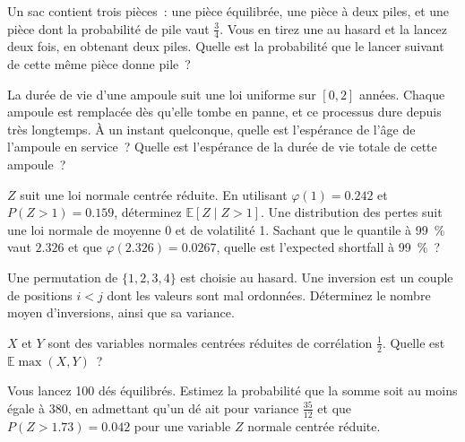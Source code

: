 
\begin{question}\label{iq:iv1:timed-test-7:7}
Un sac contient trois pièces~: une pièce équilibrée, une pièce à deux piles, et une pièce dont la probabilité de pile vaut $\frac34$. Vous en tirez une au hasard et la lancez deux fois, en obtenant deux piles. Quelle est la probabilité que le lancer suivant de cette même pièce donne pile~?
\end{question}

\begin{question}\label{iq:iv1:timed-test-7:8}
La durée de vie d'une ampoule suit une loi uniforme sur $[0, 2]$ années. Chaque ampoule est remplacée dès qu'elle tombe en panne, et ce processus dure depuis très longtemps. À un instant quelconque, quelle est l'espérance de l'âge de l'ampoule en service~? Quelle est l'espérance de la durée de vie totale de cette ampoule~?
\end{question}

\begin{question}\label{iq:iv1:timed-test-7:9}
$Z$ suit une loi normale centrée réduite. En utilisant $\varphi(1) = 0.242$ et $P(Z > 1) = 0.159$, déterminez $\mathbb{E}[Z \mid Z > 1]$. Une distribution des pertes suit une loi normale de moyenne 0 et de volatilité 1. Sachant que le quantile à 99~\% vaut $2.326$ et que $\varphi(2.326) = 0.0267$, quelle est l'expected shortfall à 99~\%~?
\end{question}

\begin{question}\label{iq:iv1:timed-test-7:10}
Une permutation de $\{1, 2, 3, 4\}$ est choisie au hasard. Une inversion est un couple de positions $i < j$ dont les valeurs sont mal ordonnées. Déterminez le nombre moyen d'inversions, ainsi que sa variance.
\end{question}

\begin{question}\label{iq:iv1:timed-test-7:11}
$X$ et $Y$ sont des variables normales centrées réduites de corrélation $\frac12$. Quelle est $\mathbb{E}\max(X, Y)$~?
\end{question}

\begin{question}\label{iq:iv1:timed-test-7:12}
Vous lancez 100 dés équilibrés. Estimez la probabilité que la somme soit au moins égale à 380, en admettant qu'un dé ait pour variance $\frac{35}{12}$ et que $P(Z > 1.73) = 0.042$ pour une variable $Z$ normale centrée réduite.
\end{question}
